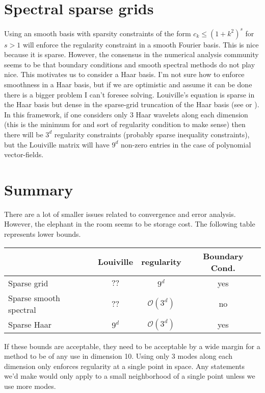 \documentclass[12pt]{amsart}
\begin{document}
\section{Spectral sparse grids}
Using an smooth basis with sparsity constraints of the form $c_k \leq (1+k^2)^s$ for $s > 1$ will enforce the regularity constraint in a smooth Fourier basis.
This is nice because it is sparse.
However, the consensus in the numerical analysis community seems to be that boundary conditions and smooth spectral methods do not play nice.
This motivates us to consider a Haar basis.
I'm not sure how to enforce smoothness in a Haar basis, but if we are optimistic and assume it can be done there is a bigger problem I can't foresee solving.
Louiville's equation is sparse in the Haar basis but dense in the sparse-grid truncation of the Haar basis (see \cite[\S 4.4.4]{koltai2011thesis} or \cite[\S 4.2.3]{JungeKoltai2009}).
In this framework, if one considers only $3$ Haar wavelets along each dimension (this is the minimum for and sort of regularity condition to make sense)
then there will be $3^d$ regularity constraints (probably sparse inequality constraints), but the Louiville matrix will have $9^d$ non-zero entries in the case of polynomial vector-fields.

\section{Summary}
There are a lot of smaller issues related to convergence and error analysis.  However, the elephant in the room seems to be storage cost.
The following table represents lower bounds.

\begin{center}
\begin{tabular}{| l | c | c | c|}
	\hline
		& Louiville & regularity & Boundary Cond. \\ \hline
	Sparse grid & $??$ & $9^d$ & yes \\ \hline
	Sparse smooth spectral & ?? & $\mathcal{O}(3^d)$ & no \\ \hline
	Sparse Haar & $9^d$ & $\mathcal{O}(3^d)$ & yes \\ \hline
\end{tabular}
\end{center}

If these bounds are acceptable, they need to be acceptable by a wide margin for a method to be of any use in dimension 10.
Using only $3$ modes along each dimension only enforces regularity at a single point in space.
Any statements we'd make would only apply to a small neighborhood of a single point unless we use more modes.
\end{document}
